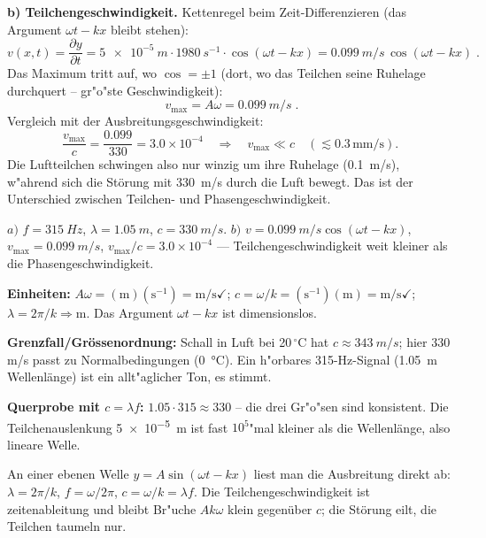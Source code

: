\textbf{b) Teilchengeschwindigkeit.} Kettenregel beim Zeit-Differenzieren
(das Argument $\omega t-kx$ bleibt stehen):
\begin{equation}
  v(x,t)=\frac{\partial y}{\partial t}
  =\qty{5e-5}{m}\cdot\qty{1980}{s^{-1}}\cdot\cos(\omega t-kx)
  =\qty{0.099}{m/s}\,\cos(\omega t-kx)\;.
\end{equation}
Das Maximum tritt auf, wo $\cos=\pm1$ (dort, wo das Teilchen seine
Ruhelage durchquert -- gr"o"ste Geschwindigkeit):
\begin{equation}
  \boxed{\;v_{\max}=A\omega=\qty{0.099}{m/s}\;}.
\end{equation}
Vergleich mit der Ausbreitungsgeschwindigkeit:
\begin{equation}
  \frac{v_{\max}}{c}=\frac{0.099}{330}=3.0\times10^{-4}
  \quad\Rightarrow\quad v_{\max}\ll c
  \quad(\lesssim0.3\,\text{mm/s}).
\end{equation}
Die Luftteilchen schwingen also nur winzig um ihre Ruhelage
(\qty{0.1}{m/s}), w"ahrend sich die Störung mit \qty{330}{m/s} durch die Luft
bewegt. Das ist der Unterschied zwischen Teilchen- und Phasengeschwindigkeit.

\begin{ergebnis}
$a)$ $f=\qty{315}{Hz}$, $\lambda=\qty{1.05}{m}$, $c=\qty{330}{m/s}$.
$b)$ $v=\qty{0.099}{m/s}\cos(\omega t-kx)$, $v_{\max}=\qty{0.099}{m/s}$,
$v_{\max}/c=3.0\times10^{-4}$ --- Teilchengeschwindigkeit weit kleiner als die
Phasengeschwindigkeit.
\end{ergebnis}

\begin{kontrolle}
\textbf{Einheiten:} $A\omega=(\mathrm{m})(\mathrm{s^{-1}})=
\mathrm{m/s}\checkmark$; $c=\omega/k=(\mathrm{s^{-1}})(\mathrm{m})=
\mathrm{m/s}\checkmark$; $\lambda=2\pi/k\Rightarrow\unit{\metre}$.
Das Argument $\omega t-kx$ ist dimensionslos. \checkmark

\textbf{Grenzfall/Grössenordnung:} Schall in Luft bei 20$\,{}^\circ$C hat
$c\approx\qty{343}{m/s}$; hier $330$ m/s passt zu Normalbedingungen
(\qty{0}{\celsius}). Ein h"orbares 315-Hz-Signal (\qty{1.05}{m}
Wellenlänge) ist ein allt"aglicher Ton, es stimmt. \checkmark

\textbf{Querprobe mit $c=\lambda f$:} $1.05\cdot315\approx330$ -- die drei
Gr"o"sen sind konsistent. Die Teilchenauslenkung \qty{5e-5}{m} ist fast
$10^5$"mal kleiner als die Wellenlänge, also lineare Welle. \checkmark
\end{kontrolle}

\begin{merksatz}
An einer ebenen Welle $y=A\sin(\omega t-kx)$ liest man die Ausbreitung direkt
ab: $\lambda=2\pi/k$, $f=\omega/2\pi$, $c=\omega/k=\lambda f$. Die
Teilchengeschwindigkeit ist zeitenableitung und bleibt Br"uche $Ak\omega$
klein gegenüber $c$; die Störung eilt, die Teilchen taumeln nur.
\end{merksatz}
